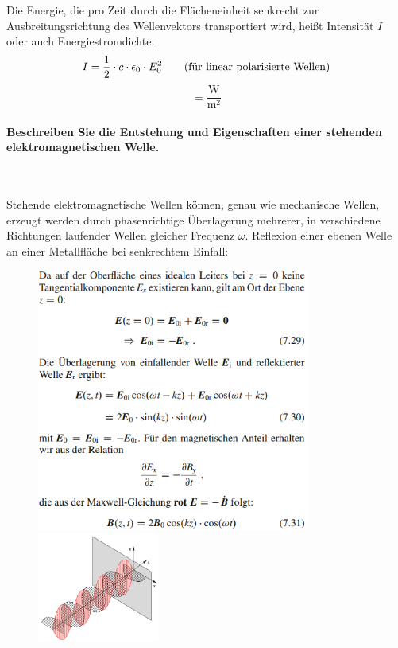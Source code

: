 \documentclass[a4paper, 11pt, ngerman, parskip=half-]{scrartcl}
\begin{document}
Die Energie, die pro Zeit durch die Flächeneinheit senkrecht zur Ausbreitungsrichtung des
Wellenvektors transportiert wird, heißt Intensität $I$ oder auch Energiestromdichte.
\begin{equation}
I = \frac{1}{2} \cdot c \cdot \epsilon_0 \cdot E_0^2 \qquad \text{(für linear polarisierte Wellen)} \\
\end{equation}
\begin{equation}
[I] = \frac{\text{W}}{\text{m}^2}
\end{equation}

\newpage

\paragraph{Beschreiben Sie die Entstehung und Eigenschaften einer stehenden elektromagnetischen
Welle.} ~

Stehende elektromagnetische Wellen können, genau wie mechanische Wellen, erzeugt werden durch
phasenrichtige Überlagerung mehrerer, in verschiedene Richtungen laufender Wellen gleicher Frequenz
$\omega$.
Reflexion einer ebenen Welle an einer Metallfläche bei senkrechtem Einfall:
\begin{figure}[H]
    \centering
    \begin{minipage}[b]{0.3\textwidth}
        \centering
        \includegraphics[width=9cm]{image/13/5.png}
    \end{minipage}
    \hspace{5cm}
    \begin{minipage}[b]{0.3\textwidth}
        \centering
        \includegraphics[width=4cm]{image/13/6.png}
    \end{minipage}
\end{figure}
\end{document}

